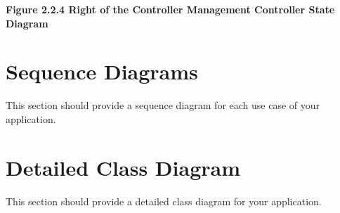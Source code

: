 \documentclass[]{article}
\begin{document}
\begin{center}
	\textbf{Figure 2.2.4 Right of the Controller Management Controller State Diagram}

\end{center}

\section{Sequence Diagrams}
\label{sec:sequence_diagrams}
This section should provide a sequence diagram for each use case of your application.
\newpage
\section{Detailed Class Diagram}
\label{sec:detailed_class_diagram}
This section should provide a detailed class diagram for your application.
\end{document}
